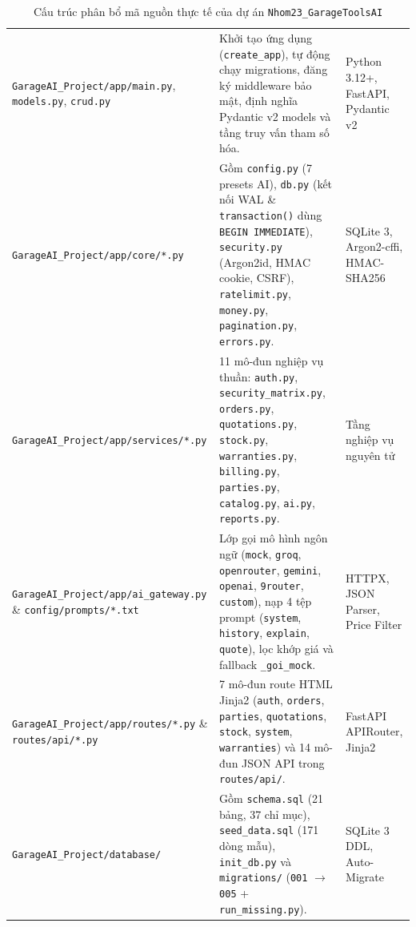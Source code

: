 \begin{table}[H]
\centering
\small
\caption{Cấu trúc phân bổ mã nguồn thực tế của dự án \texttt{Nhom23\_GarageToolsAI}}
\label{tab:g-source-tree}
\begin{tabularx}{\textwidth}{|L{4.5cm}|Y|L{3.0cm}|}
\hline
{} &  & \\
\hline
\texttt{GarageAI\_Project/app/\allowbreak main.py}, \texttt{models.py}, \texttt{crud.py} & Khởi tạo ứng dụng (\texttt{create\_app}), tự động chạy migrations, đăng ký middleware bảo mật, định nghĩa Pydantic v2 models và tầng truy vấn tham số hóa. & Python 3.12+, FastAPI, Pydantic v2\\
\hline
\texttt{GarageAI\_Project/app/\allowbreak core/*.py} & Gồm \texttt{config.py} (7 presets AI), \texttt{db.py} (kết nối WAL \& \texttt{transaction()} dùng \texttt{BEGIN IMMEDIATE}), \texttt{security.py} (Argon2id, HMAC cookie, CSRF), \texttt{ratelimit.py}, \texttt{money.py}, \texttt{pagination.py}, \texttt{errors.py}. & SQLite 3, Argon2-cffi, HMAC-SHA256\\
\hline
\texttt{GarageAI\_Project/app/\allowbreak services/*.py} & 11 mô-đun nghiệp vụ thuần: \texttt{auth.py}, \texttt{security\_matrix.py}, \texttt{orders.py}, \texttt{quotations.py}, \texttt{stock.py}, \texttt{warranties.py}, \texttt{billing.py}, \texttt{parties.py}, \texttt{catalog.py}, \texttt{ai.py}, \texttt{reports.py}. & Tầng nghiệp vụ nguyên tử\\
\hline
\texttt{GarageAI\_Project/app/\allowbreak ai\_gateway.py} \& \texttt{config/prompts/*.txt} & Lớp gọi mô hình ngôn ngữ (\texttt{mock}, \texttt{groq}, \texttt{openrouter}, \texttt{gemini}, \texttt{openai}, \texttt{9router}, \texttt{custom}), nạp 4 tệp prompt (\texttt{system}, \texttt{history}, \texttt{explain}, \texttt{quote}), lọc khớp giá và fallback \texttt{\_goi\_mock}. & HTTPX, JSON Parser, Price Filter\\
\hline
\texttt{GarageAI\_Project/app/\allowbreak routes/*.py} \& \texttt{routes/api/*.py} & 7 mô-đun route HTML Jinja2 (\texttt{auth}, \texttt{orders}, \texttt{parties}, \texttt{quotations}, \texttt{stock}, \texttt{system}, \texttt{warranties}) và 14 mô-đun JSON API trong \texttt{routes/api/}. & FastAPI APIRouter, Jinja2\\
\hline
\texttt{GarageAI\_Project/\allowbreak database/} & Gồm \texttt{schema.sql} (21 bảng, 37 chỉ mục), \texttt{seed\_data.sql} (171 dòng mẫu), \texttt{init\_db.py} và \texttt{migrations/} (\texttt{001} $\rightarrow$ \texttt{005} + \texttt{run\_missing.py}). & SQLite 3 DDL, Auto-Migrate\\

\end{tabularx}
\end{table}
